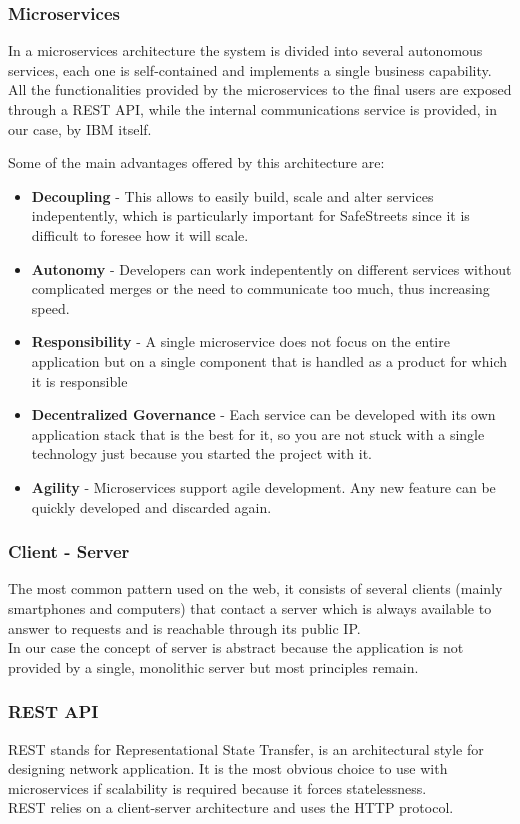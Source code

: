 \subsubsection{Microservices}
In a microservices architecture the system is divided into several autonomous services, each one is self-contained and implements a single business capability.
\\All the functionalities provided by the microservices to the final users are exposed through a REST API, while the internal communications service is provided, in our case, by IBM itself.

Some of the main advantages offered by this architecture are:
\begin{itemize}
    \item \textbf{Decoupling} - This allows to easily build, scale and alter services indepentently, which is particularly important for SafeStreets since it is difficult to foresee how it will scale.
    \item \textbf{Autonomy} - Developers can work indepentently on different services without complicated merges or the need to communicate too much, thus increasing speed.
    \item \textbf{Responsibility} - A single microservice does not focus on the entire application but on a single component that is handled as a product for which it is responsible
    \item \textbf{Decentralized Governance} - Each service can be developed with its own application stack that is the best for it, so you are not stuck with a single technology just because you started the project with it.
    \item \textbf{Agility} - Microservices support agile development. Any new feature can be quickly developed and discarded again.
\end{itemize}


\subsubsection{Client - Server}
The most common pattern used on the web, it consists of several clients (mainly smartphones and computers) that contact a server which is always available to answer to requests and is reachable through its public IP.
\\In our case the concept of server is abstract because the application is not provided by a single, monolithic server but most principles remain.

\subsubsection{REST API}
REST stands for Representational State Transfer, is an architectural style for designing network application.
It is the most obvious choice to use with microservices if scalability is required because it forces statelessness.
\\REST relies on a client-server architecture and uses the HTTP protocol.